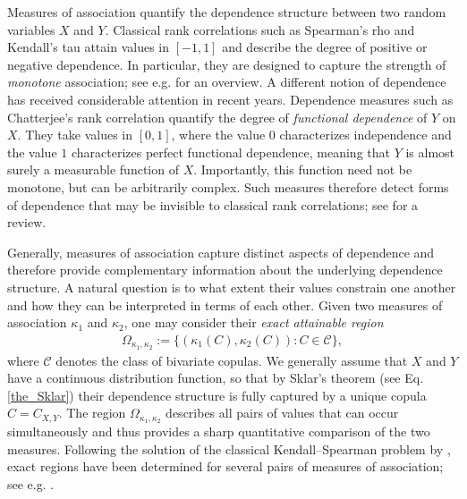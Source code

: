 \documentclass{article}
\newcommand{\CC}{\mathcal{C}}
\begin{document}
Measures of association quantify the dependence structure between two random variables \(X\) and \(Y\).
Classical rank correlations such as Spearman's rho and Kendall's tau attain values in \([-1,1]\) and
describe the degree of positive or negative dependence. In
particular, they are designed to capture the strength of
    \emph{monotone} association; see e.g. \cite[Section 2.4]{durante2016principles} for an overview.
A different notion of dependence has received considerable attention in
recent years. Dependence measures such as Chatterjee's rank correlation \cite{chatterjee2021new}
quantify the degree of \emph{functional dependence} of \(Y\) on \(X\).
They take values in \([0,1]\), where the value \(0\) characterizes
independence and the value \(1\) characterizes perfect functional
dependence, meaning that \(Y\) is almost surely a measurable function of
\(X\). Importantly, this function need not be monotone, but can be arbitrarily complex. Such measures
therefore detect forms of dependence that may be invisible to classical
rank correlations; see \cite{chatterjee2024survey} for a review.

Generally, measures of association capture distinct aspects of dependence and
therefore provide complementary information about the underlying
dependence structure.
A natural question is to what extent their values constrain one another
and how they can be interpreted in terms of each other. Given two measures of association \(\kappa_1\) and \(\kappa_2\), one may consider their
\emph{exact attainable region}
\begin{align*}
    \Omega_{\kappa_1,\kappa_2}
    :=
    \bigl\{
        (\kappa_1(C),\kappa_2(C)):C\in\CC
    \bigr\},
\end{align*}
where \(\CC\) denotes the class of bivariate copulas. We generally assume that \(X\) and \(Y\) have a continuous distribution function, so that by Sklar's theorem (see Eq. \eqref{the_Sklar}) their dependence structure is fully captured by a unique copula \(C=C_{X,Y}\). The region \(\Omega_{\kappa_1,\kappa_2}\)
describes all pairs of values that can occur simultaneously and thus
provides a sharp quantitative comparison of the two measures.
Following the solution of the classical Kendall--Spearman problem by
\citet{schreyer2017exact}, exact regions have been determined for
several pairs of measures of association; see e.g.
\cite{kokolbukovsek2021spearman,kokolbukovsek2022exact,
kokolbukovsek2023exact,ansari2026exact}.
\end{document}
